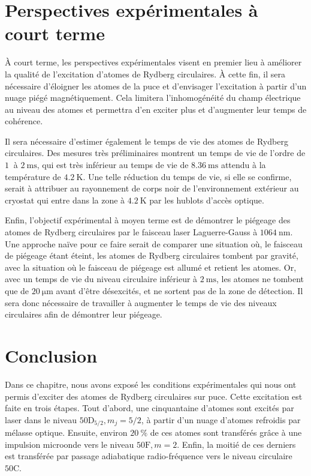 \section{Perspectives expérimentales à court terme}
\noindent \`A court terme, les perspectives expérimentales visent en premier lieu à améliorer la qualité de l'excitation d'atomes de Rydberg circulaires.
\`A cette fin, il sera nécessaire d'éloigner les atomes de la puce et d'envisager l'excitation à partir d'un nuage piégé magnétiquement.
Cela limitera l'inhomogénéité du champ électrique au niveau des atomes et permettra d'en exciter plus et d'augmenter leur temps de cohérence.

Il sera nécessaire d'estimer également le temps de vie des atomes de Rydberg circulaires.
Des mesures très préliminaires montrent un temps de vie de l'ordre de $\SI{1}{}$ à $\SI{2}{\ms}$, qui est très inférieur au temps de vie de $\SI{8.36}{\ms}$ attendu à la température de $\SI{4.2}{\K}$.
Une telle réduction du temps de vie, si elle se confirme, serait à attribuer au rayonnement de corps noir de l'environnement extérieur au cryostat qui entre dans la zone à $\SI{4.2}{\K}$ par les hublots d'accès optique.

Enfin, l'objectif expérimental à moyen terme est de démontrer le piégeage des atomes de Rydberg circulaires par le faisceau laser Laguerre-Gauss à $\SI{1064}{\nano\meter}$.
Une approche naïve pour ce faire serait de comparer une situation où, le faisceau de piégeage étant éteint, les atomes de Rydberg circulaires tombent par gravité, avec la situation où le faisceau de piégeage est allumé et retient les atomes.
Or, avec un temps de vie du niveau circulaire inférieur à $\SI{2}{\ms}$, les atomes ne tombent que de $\SI{20}{\um}$ avant d'être désexcités, et ne sortent pas de la zone de détection.
Il sera donc nécessaire de travailler à augmenter le temps de vie des niveaux circulaires afin de démontrer leur piégeage.

\section*{Conclusion}
\noindent Dans ce chapitre, nous avons exposé les conditions expérimentales qui nous ont permis d'exciter des atomes de Rydberg circulaires sur puce.
Cette excitation est faite en trois étapes.
Tout d'abord, une cinquantaine d'atomes sont excités par laser dans le niveau $\mathrm{50D}_{5/2},m_j=5/2$, à partir d'un nuage d'atomes refroidis par mélasse optique.
Ensuite, environ $\SI{20}{\percent}$ de ces atomes sont transférés grâce à une impulsion microonde vers le niveau $\mathrm{50F},m=2$.
Enfin, la moitié de ces derniers est transférée par passage adiabatique radio-fréquence vers le niveau circulaire $\mathrm{50C}$.

